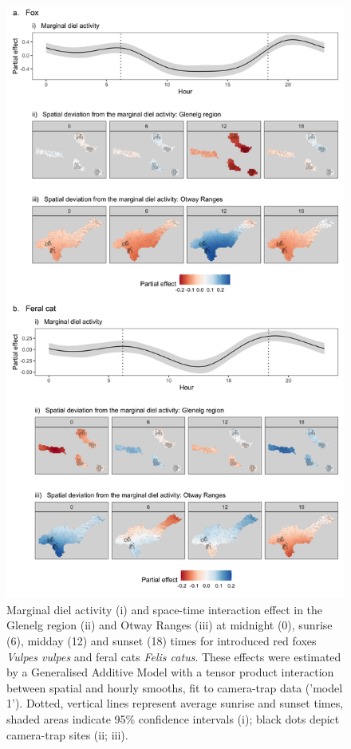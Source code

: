 \documentclass[preprint, 3p, authoryear]{elsarticle} %
\begin{document}
\newpage

\begin{figure}

{\centering \includegraphics[width=0.7\linewidth]{../figs/spatial_interaction} 

}

\caption{Marginal diel activity (i) and space-time interaction effect in the Glenelg region (ii) and Otway Ranges (iii) at midnight (0), sunrise (6), midday (12) and sunset (18) times for introduced red foxes \textit{Vulpes vulpes} and feral cats \textit{Felis catus}. These effects were estimated by a Generalised Additive Model with a tensor product interaction between spatial and hourly smooths, fit to camera-trap data ('model 1'). Dotted, vertical lines represent average sunrise and sunset times, shaded areas indicate 95\% confidence intervals (i); black dots depict camera-trap sites (ii; iii).}\label{fig:diel-st-int}
\end{figure}

\newpage
\end{document}
